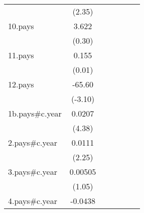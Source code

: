 {\begin{tabular}{l*{6}{c}}
                    &      (2.35)         &                     &                     &                     &                     &                     \\
[1em]
10.pays             &       3.622         &                     &                     &                     &                     &                     \\
                    &      (0.30)         &                     &                     &                     &                     &                     \\
[1em]
11.pays             &       0.155         &                     &                     &                     &                     &                     \\
                    &      (0.01)         &                     &                     &                     &                     &                     \\
[1em]
12.pays             &      -65.60\sym{**} &                     &                     &                     &                     &                     \\
                    &     (-3.10)         &                     &                     &                     &                     &                     \\
[1em]
1b.pays#c.year      &      0.0207\sym{***}&                     &                     &                     &                     &                     \\
                    &      (4.38)         &                     &                     &                     &                     &                     \\
[1em]
2.pays#c.year       &      0.0111\sym{*}  &                     &                     &                     &                     &                     \\
                    &      (2.25)         &                     &                     &                     &                     &                     \\
[1em]
3.pays#c.year       &     0.00505         &                     &                     &                     &                     &                     \\
                    &      (1.05)         &                     &                     &                     &                     &                     \\
[1em]
4.pays#c.year       &     -0.0438\sym{***}&                     &                     &                     &                     &                     \\

\end{tabular}}
